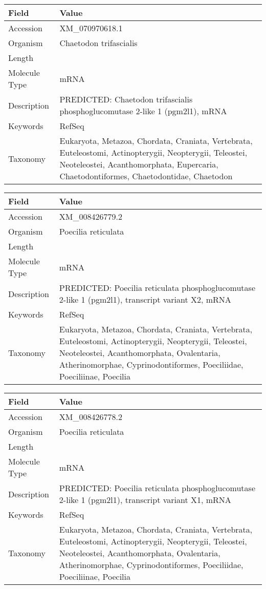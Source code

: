 \documentclass[10pt]{article}
\begin{document}
\vspace{1em}
{\footnotesize
\begin{longtable}{>{\raggedright\arraybackslash}p{4.5cm} >{\raggedright\arraybackslash}p{11.5cm}}
\textbf{Field} & \textbf{Value} \\
\hline
Accession & XM\_070970618.1 \\
Organism & Chaetodon trifascialis \\
Length & 3381 \\
Molecule Type & mRNA \\
Description & PREDICTED: Chaetodon trifascialis phosphoglucomutase 2-like 1 (pgm2l1), mRNA \\
Keywords & RefSeq \\
Taxonomy & Eukaryota, Metazoa, Chordata, Craniata, Vertebrata, Euteleostomi, Actinopterygii, Neopterygii, Teleostei, Neoteleostei, Acanthomorphata, Eupercaria, Chaetodontiformes, Chaetodontidae, Chaetodon \\
\end{longtable}
}

\vspace{1em}
{\footnotesize
\begin{longtable}{>{\raggedright\arraybackslash}p{4.5cm} >{\raggedright\arraybackslash}p{11.5cm}}
\textbf{Field} & \textbf{Value} \\
\hline
Accession & XM\_008426779.2 \\
Organism & Poecilia reticulata \\
Length & 3021 \\
Molecule Type & mRNA \\
Description & PREDICTED: Poecilia reticulata phosphoglucomutase 2-like 1 (pgm2l1), transcript variant X2, mRNA \\
Keywords & RefSeq \\
Taxonomy & Eukaryota, Metazoa, Chordata, Craniata, Vertebrata, Euteleostomi, Actinopterygii, Neopterygii, Teleostei, Neoteleostei, Acanthomorphata, Ovalentaria, Atherinomorphae, Cyprinodontiformes, Poeciliidae, Poeciliinae, Poecilia \\
\end{longtable}
}

\vspace{1em}
{\footnotesize
\begin{longtable}{>{\raggedright\arraybackslash}p{4.5cm} >{\raggedright\arraybackslash}p{11.5cm}}
\textbf{Field} & \textbf{Value} \\
\hline
Accession & XM\_008426778.2 \\
Organism & Poecilia reticulata \\
Length & 3028 \\
Molecule Type & mRNA \\
Description & PREDICTED: Poecilia reticulata phosphoglucomutase 2-like 1 (pgm2l1), transcript variant X1, mRNA \\
Keywords & RefSeq \\
Taxonomy & Eukaryota, Metazoa, Chordata, Craniata, Vertebrata, Euteleostomi, Actinopterygii, Neopterygii, Teleostei, Neoteleostei, Acanthomorphata, Ovalentaria, Atherinomorphae, Cyprinodontiformes, Poeciliidae, Poeciliinae, Poecilia \\
\end{longtable}
}
\end{document}
